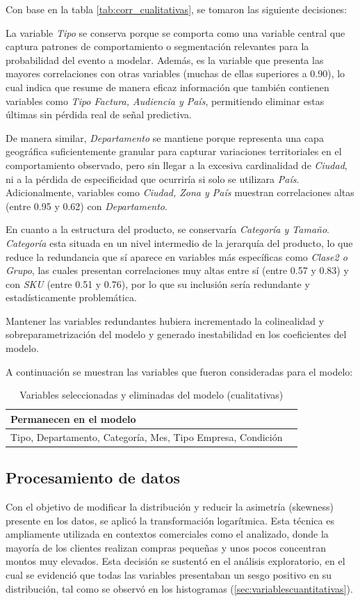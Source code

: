 Con base en la tabla \ref{tab:corr_cualitativas}, se tomaron las siguiente decisiones:

La variable \textit{Tipo} se conserva porque se comporta como una variable central que captura patrones de comportamiento o segmentación relevantes para la probabilidad del evento a modelar. Además, es la variable que presenta las mayores correlaciones con otras variables (muchas de ellas superiores a 0.90), lo cual indica que resume de manera eficaz información que también contienen variables como \textit{Tipo Factura, Audiencia y País}, permitiendo eliminar estas últimas sin pérdida real de señal predictiva. 

De manera similar, \textit{Departamento} se mantiene porque representa una capa geográfica suficientemente granular para capturar variaciones territoriales en el comportamiento observado, pero sin llegar a la excesiva cardinalidad de \textit{Ciudad}, ni a la pérdida de especificidad que ocurriría si solo se utilizara \textit{País}. Adicionalmente, variables como \textit{Ciudad, Zona y País} muestran correlaciones altas (entre 0.95 y 0.62) con \textit{Departamento}.

En cuanto a la estructura del producto, se conservaría \textit{Categoría y Tamaño}. \textit{Categoría} esta situada en un nivel intermedio de la jerarquía del producto, lo que reduce la redundancia que sí aparece en variables más específicas como \textit{Clase2 o Grupo}, las cuales presentan correlaciones muy altas entre sí (entre 0.57 y 0.83) y con \textit{SKU} (entre 0.51 y 0.76), por lo que su inclusión sería redundante y estadísticamente problemática.


Mantener las variables redundantes hubiera incrementado la colinealidad y sobreparametrización del modelo y generado inestabilidad en los coeficientes del modelo.

A continuación se muestran las variables que fueron consideradas para el modelo:
\begin{table}[H]
\centering
\caption{Variables seleccionadas y eliminadas del modelo (cualitativas)}
\begin{tabular}{p{7cm} p{7cm}}
\hline
\textbf{Permanecen en el modelo} \\
\hline
Tipo, Departamento, Categoría, Mes, Tipo Empresa, Condición \\
\hline
\end{tabular}
\end{table}

\subsection{Procesamiento de datos}
Con el objetivo de modificar la distribución y reducir la asimetría (skewness) presente en los datos, se aplicó la transformación logarítmica. Esta técnica es ampliamente utilizada en contextos comerciales como el analizado, donde la mayoría de los clientes realizan compras pequeñas y unos pocos concentran montos muy elevados. Esta decisión se sustentó en el análisis exploratorio, en el cual se evidenció que todas las variables presentaban un sesgo positivo en su distribución, tal como se observó en los histogramas (\ref{sec:variablescuantitativas}).

